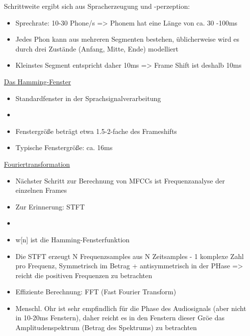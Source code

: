 \documentclass[a4paper,10pt,oneside]{article}
\begin{document}
Schrittweite ergibt sich aus Spracherzeugung und -perzeption:
	\begin{itemize}
		\item Sprechrate: 10-30 Phone/s => Phonem hat eine Länge von ca. 30 -100ms
		\item Jedes Phon kann aus mehreren Segmenten bestehen, üblicherweise wird es durch drei Zustände (Anfang, Mitte, Ende) modelliert
		\item Kleinstes Segment entspricht daher 10ms => Frame Shift ist deshalb 10ms
	\end{itemize}
	
\underline{Das Hamming-Fenster} \\
	\begin{itemize}
		\item Standardfenster in der Sprachsignalverarbeitung
		\item[] %
		\item Fenstergröße beträgt etwa 1.5-2-fache des Frameshifts
		\item Typische Fenstergröße: ca. 16ms
	\end{itemize}
	
\underline{Fouriertransformation} \\
	\begin{itemize}
		\item Nächster Schritt zur Berechnung von MFCCs ist Frequenzanalyse der einzelnen Frames
		\item Zur Erinnerung: STFT
		\item[] %
		\item w[n] ist die Hamming-Fensterfunktion
		\item Die STFT erzeugt N Frequenzsamples aus N Zeitsamples - 1 komplexe Zahl pro Frequenz, Symmetrisch im Betrag + antisymmetrisch in der PHase => reicht die positiven Frequenzen zu betrachten
		\item Effiziente Berechnung: FFT (Fast Fourier Transform)
		\item Menschl. Ohr ist sehr empfindlich für die Phase des Audiosignals (aber nicht in 10-20ms Fenstern), daher reicht es in den Fenstern dieser Gröe das Amplitudenspektrum (Betrag des Spektrums) zu betrachten
	\end{itemize}
	
\end{document}
